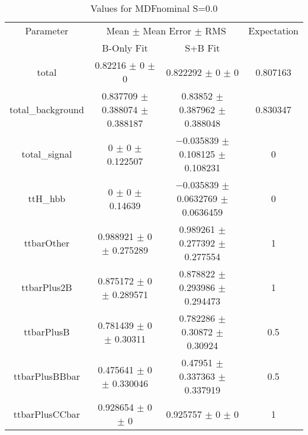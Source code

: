\begin{table}
\centering
\caption{Values for MDFnominal S=0.0}
\begin{tabular}{cccc}
\toprule
Parameter & \multicolumn{2}{c}{Mean $\pm$ Mean Error $\pm$ RMS} & Expectation\\
 & B-Only Fit & S+B Fit & \\
\midrule
total & \num{0.82216} $\pm$ \num{0} $\pm$ \num{0} & \num{0.822292} $\pm$ \num{0} $\pm$ \num{0} & \num{0.807163}\\
total\_background & \num{0.837709} $\pm$ \num{0.388074} $\pm$ \num{0.388187} & \num{0.83852} $\pm$ \num{0.387962} $\pm$ \num{0.388048} & \num{0.830347}\\
total\_signal & \num{0} $\pm$ \num{0} $\pm$ \num{0.122507} & \num{-0.035839} $\pm$ \num{0.108125} $\pm$ \num{0.108231} & \num{0}\\
ttH\_hbb & \num{0} $\pm$ \num{0} $\pm$ \num{0.14639} & \num{-0.035839} $\pm$ \num{0.0632769} $\pm$ \num{0.0636459} & \num{0}\\
ttbarOther & \num{0.988921} $\pm$ \num{0} $\pm$ \num{0.275289} & \num{0.989261} $\pm$ \num{0.277392} $\pm$ \num{0.277554} & \num{1}\\
ttbarPlus2B & \num{0.875172} $\pm$ \num{0} $\pm$ \num{0.289571} & \num{0.878822} $\pm$ \num{0.293986} $\pm$ \num{0.294473} & \num{1}\\
ttbarPlusB & \num{0.781439} $\pm$ \num{0} $\pm$ \num{0.30311} & \num{0.782286} $\pm$ \num{0.30872} $\pm$ \num{0.30924} & \num{0.5}\\
ttbarPlusBBbar & \num{0.475641} $\pm$ \num{0} $\pm$ \num{0.330046} & \num{0.47951} $\pm$ \num{0.337363} $\pm$ \num{0.337919} & \num{0.5}\\
ttbarPlusCCbar & \num{0.928654} $\pm$ \num{0} $\pm$ \num{0} & \num{0.925757} $\pm$ \num{0} $\pm$ \num{0} & \num{1}\\
\bottomrule
\end{tabular}
\end{table}